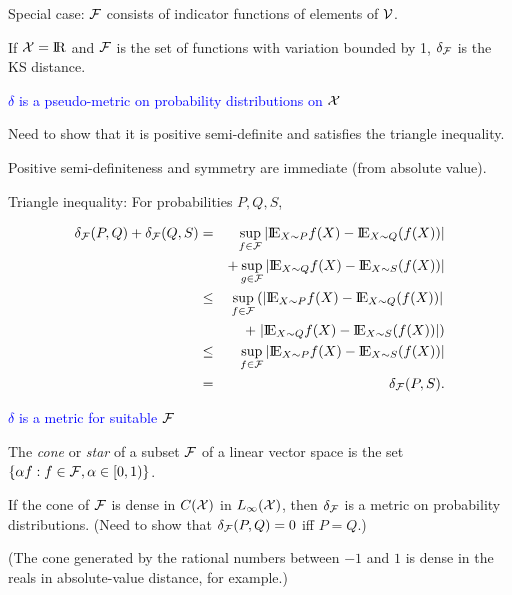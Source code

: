\documentclass[landscape]{slides}
\newcommand{\EE}{\hbox{I\kern-.1667em\hbox{E}}}
\newcommand{\cF}{{\cal F}}
\newcommand{\cV}{{\cal V}}
\newcommand{\cX}{{\cal X}}
\def\Real{\hbox{I\kern-.17em\hbox{R}}}
\newcommand{\bfR}{\Real}
\begin{document}
\begin{slide}
\begin{slide}
Special case: $\cF$ consists of indicator functions of elements of 
$\cV$.

If $\cX = \bfR$ and $\cF$ is the set of functions with variation
bounded by 1, $\delta_\cF$ is the KS distance.

\end{slide}

\begin{slide}
{\textcolor{blue}{$\delta$ is a pseudo-metric on probability distributions on $\cX$}}

Need to show that it is positive semi-definite and satisfies the triangle inequality.

Positive semi-definiteness and symmetry are immediate (from absolute value).

Triangle inequality:  For probabilities $P, Q, S$,

\begin{eqnarray}
\delta_\cF(P, Q) + \delta_\cF(Q, S) & = &
\sup_{f \in \cF} | \EE_{X \sim P} f(X) - \EE_{X \sim Q} (f(X)) | \nonumber  \\
&& +
\sup_{g \in \cF} | \EE_{X \sim Q} f(X) - \EE_{X \sim S} (f(X)) | \nonumber \\
& \le & 
\sup_{f \in \cF}  \left ( | \EE_{X \sim P} f(X) - \EE_{X \sim Q} (f(X)) | \right . 
     \nonumber \\
&& 
     +  \left .       | \EE_{X \sim Q} f(X) - \EE_{X \sim S} (f(X)) | 
                           \right ) \nonumber \\
& \le &
\sup_{f \in \cF}   | \EE_{X \sim P} f(X) - \EE_{X \sim S} (f(X)) |  \nonumber \\
& = & 
\delta_\cF(P, S).
\end{eqnarray}

\end{slide}

\begin{slide}
{\textcolor{blue}{$\delta$ is a metric for suitable $\cF$}}

The {\em cone\/} or {\em star\/} of a subset $\cF$ of a linear vector space is the set
$\{ \alpha f: f \in \cF, \alpha \in [0, 1) \}$.

If the cone of $\cF$ is dense in $C(\cX)$ in $L_\infty(\cX)$, then
$\delta_\cF$ is a metric on probability distributions.
(Need to show that $\delta_\cF(P, Q) = 0$ iff $P = Q$.)

(The cone generated by the rational numbers between $-1$ and $1$ is dense in
the reals in absolute-value distance, for example.)


\end{slide}
\end{slide}
\end{document}
